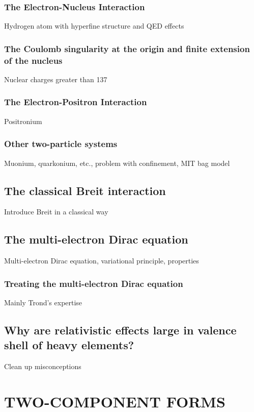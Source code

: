 \documentclass[12pt]{article}
\begin{document}
\subsubsection{\sffamily The Electron-Nucleus Interaction}
Hydrogen atom with hyperfine structure and QED effects

\subsubsection{\sffamily The Coulomb singularity at the origin and finite extension of the nucleus}
Nuclear charges greater than 137

\subsubsection{\sffamily The Electron-Positron Interaction}
Positronium

\subsubsection{\sffamily Other two-particle systems}
Muonium, quarkonium, etc., problem with confinement, MIT bag model

\subsection{\sffamily The classical Breit interaction}
Introduce Breit in a classical way

\subsection{\label{ME-Dirac} \sffamily The multi-electron Dirac equation}
Multi-electron Dirac equation, variational principle, properties

\subsubsection{\sffamily Treating the multi-electron Dirac equation}
Mainly Trond's expertise

\subsection{\label{RelVal}\sffamily Why are relativistic effects large in valence shell of heavy elements?}
Clean up misconceptions

\section{\label{TwoComp} \sffamily \Large TWO-COMPONENT FORMS}
\end{document}
